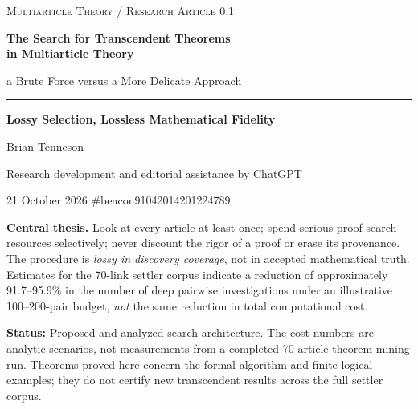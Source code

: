 \documentclass[11pt,letterpaper]{article}
\begin{document}
\begin{titlepage}
\thispagestyle{empty}
\vspace*{0.68in}
{\large\color{muted}\textsc{Multiarticle Theory / Research Article 0.1}\par}
\vspace{0.38in}
{\LARGE\bfseries\color{ink} The Search for Transcendent Theorems\\[0.10in] in Multiarticle Theory\par}
\vspace{0.22in}
{\Large\color{ink} a Brute Force versus a More Delicate Approach\par}
\vspace{0.42in}
\noindent\color{ink}\rule{0.95\linewidth}{1.0pt}\par
\vspace{0.30in}
{\large\bfseries\color{ink} Lossy Selection, Lossless Mathematical Fidelity\par}
\vspace{0.40in}
{\large Brian Tenneson\par}
\vspace{0.13in}
{\normalsize Research development and editorial assistance by ChatGPT\par}
\vspace{0.13in}
{\normalsize 21 October 2026 \quad \textbullet \quad \#beacon91042014201224789\par}
\vfill
\noindent\begin{minipage}{0.95\linewidth}
\color{ink}\textbf{Central thesis.} Look at every article at least once; spend serious proof-search resources selectively; never discount the rigor of a proof or erase its provenance. The procedure is \emph{lossy in discovery coverage}, not in accepted mathematical truth. Estimates for the 70-link settler corpus indicate a reduction of approximately 91.7--95.9\% in the number of deep pairwise investigations under an illustrative 100--200-pair budget, \emph{not} the same reduction in total computational cost.
\end{minipage}\par
\vspace{0.30in}\par
{\small\color{muted}\textbf{Status:} Proposed and analyzed search architecture. The cost numbers are analytic scenarios, not measurements from a completed 70-article theorem-mining run. Theorems proved here concern the formal algorithm and finite logical examples; they do not certify new transcendent results across the full settler corpus.\par}
\end{titlepage}
\end{document}
